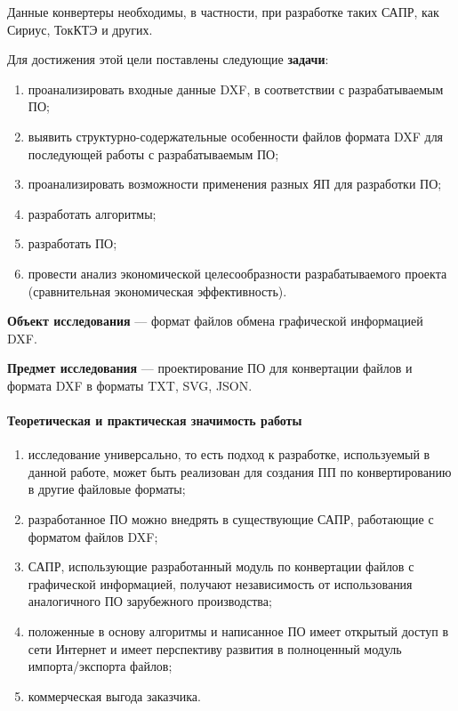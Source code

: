 Данные конвертеры необходимы, в частности, при разработке таких САПР, как Сириус, ТокКТЭ и других.

Для достижения этой цели поставлены следующие \textbf{задачи}:

\begin{enumerate}[1)]
	\item проанализировать входные данные DXF, в соответствии с разрабатываемым ПО;
	\item выявить структурно-содержательные особенности файлов формата DXF для последующей работы с разрабатываемым ПО;
	\item проанализировать возможности применения разных ЯП для разработки ПО;
	\item разработать алгоритмы;
	\item разработать ПО;
	\item провести анализ экономической целесообразности разрабатываемого проекта (сравнительная экономическая эффективность).
\end{enumerate}

\textbf{Объект исследования} --- формат файлов обмена графической информацией DXF.

\textbf{Предмет исследования} --- проектирование ПО для конвертации файлов и формата DXF в форматы TXT, SVG, JSON.

\paragraph{Теоретическая и практическая значимость работы}

\begin{enumerate}
	\item исследование универсально, то есть подход к разработке, используемый в данной работе, может быть реализован для создания ПП по конвертированию в другие файловые форматы;
	\item разработанное ПО можно внедрять в существующие САПР, работающие с форматом файлов DXF;
	\item САПР, использующие разработанный модуль по конвертации файлов с графической информацией, получают независимость от использования аналогичного ПО зарубежного производства;
	\item положенные в основу алгоритмы и написанное ПО имеет открытый доступ в сети Интернет и имеет перспективу развития в полноценный модуль импорта/экспорта файлов;
	\item коммерческая выгода заказчика.
\end{enumerate}